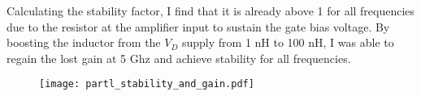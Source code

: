 Calculating the stability factor, I find that it is already above 1 for all frequencies due to the resistor at the amplifier input to sustain the gate bias voltage. By boosting the inductor from the $V_{D}$ supply from 1 nH to 100 nH, I was able to regain the lost gain at 5 Ghz and achieve stability for all frequencies.

\begin{figure}[H]
    \centering \texttt{[image: partl\_stability\_and\_gain.pdf]}
\end{figure}

